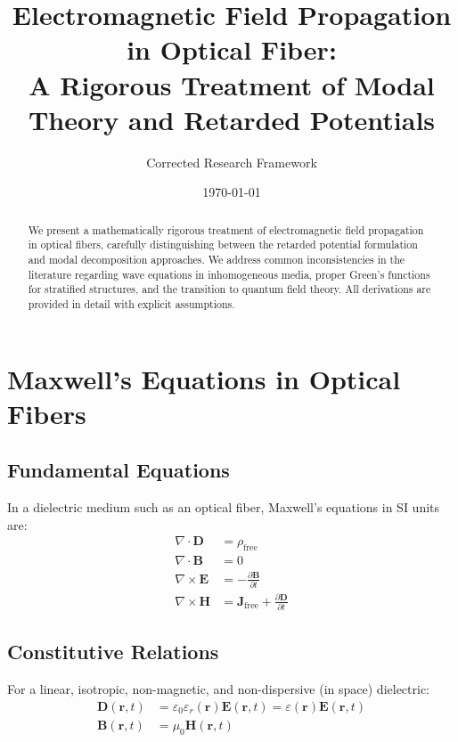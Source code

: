 \documentclass[12pt,a4paper]{article}
\title{\textbf{Electromagnetic Field Propagation in Optical Fiber:} \\ \textbf{A Rigorous Treatment of Modal Theory and Retarded Potentials}}
\author{Corrected Research Framework}
\date{\today}
\begin{document}
\maketitle

\begin{abstract}
We present a mathematically rigorous treatment of electromagnetic field propagation in optical fibers, carefully distinguishing between the retarded potential formulation and modal decomposition approaches. We address common inconsistencies in the literature regarding wave equations in inhomogeneous media, proper Green's functions for stratified structures, and the transition to quantum field theory. All derivations are provided in detail with explicit assumptions.
\end{abstract}

\tableofcontents
\newpage

\section{Maxwell's Equations in Optical Fibers}

\subsection{Fundamental Equations}

In a dielectric medium such as an optical fiber, Maxwell's equations in SI units are:
\begin{align}
\nabla \cdot \mathbf{D} &= \rho_{\text{free}} \tag{Gauss's Law} \label{eq:gauss}\\
\nabla \cdot \mathbf{B} &= 0 \tag{No magnetic monopoles} \label{eq:no_monopole}\\
\nabla \times \mathbf{E} &= -\frac{\partial \mathbf{B}}{\partial t} \tag{Faraday's Law} \label{eq:faraday}\\
\nabla \times \mathbf{H} &= \mathbf{J}_{\text{free}} + \frac{\partial \mathbf{D}}{\partial t} \tag{Ampère-Maxwell Law} \label{eq:ampere}
\end{align}

\subsection{Constitutive Relations}

For a linear, isotropic, non-magnetic, and non-dispersive (in space) dielectric:
\begin{align}
\mathbf{D}(\mathbf{r},t) &= \varepsilon_0 \varepsilon_r(\mathbf{r}) \mathbf{E}(\mathbf{r},t) = \varepsilon(\mathbf{r}) \mathbf{E}(\mathbf{r},t) \label{eq:const_D}\\
\mathbf{B}(\mathbf{r},t) &= \mu_0 \mathbf{H}(\mathbf{r},t) \label{eq:const_B}
\end{align}
\end{document}
